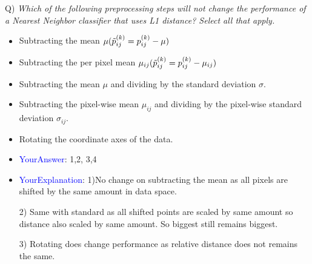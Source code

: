 \documentclass[twoside]{article}
\begin{document}
Q) \textit{Which of the following preprocessing steps will not change the performance of a Nearest Neighbor classifier that uses L1 distance? Select all that apply.}
\begin{itemize}
\item Subtracting the mean  $\mu(\Tilde{p}^{(k)}_{ij}=p^{(k)}_{ij} - \mu)$
\item Subtracting the per pixel mean  $\mu_{ij}(\Tilde{p}^{(k)}_{ij}=p^{(k)}_{ij} - \mu_{ij})$
\item Subtracting the mean  $\mu$  and dividing by the standard deviation  $\sigma$.
\item Subtracting the pixel-wise mean  $\mu_{ij}$  and dividing by the pixel-wise standard deviation  $\sigma_{ij}$.

\item Rotating the coordinate axes of the data.

\item \textcolor{blue}{YourAnswer}:  1,2, 3,4

\item \textcolor{blue}{YourExplanation}:  1)No change on subtracting the mean as all pixels are shifted by the same amount in data space.

2) Same with standard as all shifted points are scaled by same amount so distance also scaled by same amount. So biggest still remains biggest.

3) Rotating does change performance as relative distance does not remains the same.

\end{itemize}

\end{document}
